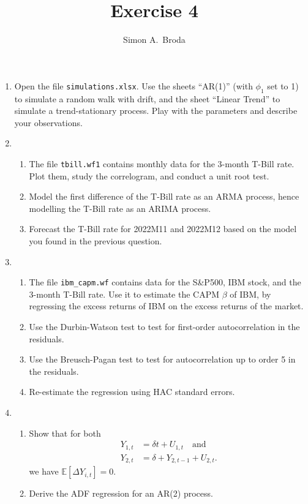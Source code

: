 \documentclass[11pt, a4paper]{article}
\newcommand{\E}{\ensuremath{{\mathbb E}}} %
\begin{document}
\title{Exercise 4}
\author{Simon A.\ Broda}
\date{}
\maketitle

\begin{enumerate}
\item  Open the file \texttt{simulations.xlsx}. Use the sheets ``AR(1)'' (with $\phi_1$ set to 1) to simulate a random walk with drift, and the sheet ``Linear Trend'' to simulate a trend-stationary process. Play with the parameters and describe your observations.
\item
\begin{enumerate}
\item The file \texttt{tbill.wf1} contains monthly data for the 3-month T-Bill rate. Plot them, study the correlogram, and conduct a unit root test.
\item Model the first difference of the T-Bill rate as an ARMA process, hence modelling the T-Bill rate as an ARIMA process.
\item Forecast the T-Bill rate for 2022M11 and 2022M12 based on the model you found in the previous question.
\end{enumerate}
\item
\begin{enumerate}
\item The file \verb+ibm_capm.wf+ contains data for the S\&P500, IBM stock, and the 3-month T-Bill rate. Use it to estimate the CAPM $\beta$ of IBM, by regressing the excess returns of IBM on the excess returns of the market.
\item Use the Durbin-Watson test to test for first-order autocorrelation in the residuals.
\item Use the Breusch-Pagan test to test for autocorrelation up to order 5 in the residuals.
\item Re-estimate the regression using HAC standard errors.
\end{enumerate}
\item
\begin{enumerate}

\item Show that for both \begin{align*}
Y_{1,t}&=\delta t+U_{1,t} \quad\mbox{and}\\
Y_{2,t}&=\delta + Y_{2,t-1}+U_{2,t}.
\end{align*}
we have $\E[\Delta Y_{i, t}]=0$.
\item Derive the ADF regression for an AR(2) process.
\end{enumerate}


\end{enumerate}
\end{document}
